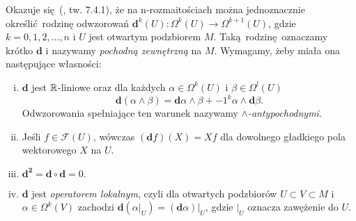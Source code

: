 Okazuje się (\cite{marsden}, tw. 7.4.1), że na n-rozmaitościach można jednoznacznie określić rodzinę odwzorowań \(\mathbf{d}^k(U): \Omega^k(U)\to \Omega^{k+1}(U)\), gdzie \(k=0, 1, 2, \dots, n\) i \(U\) jest otwartym podzbiorem \(M\). Taką rodzinę oznaczamy krótko \(\mathbf{d}\) i nazywamy \emph{pochodną zewnętrzną} na \(M\). Wymagamy, żeby miała ona następujące własności:
\begin{enumerate}[i)]
    \item \(\mathbf{d}\) jest \(\mathbb{R}\)-liniowe oraz dla każdych \(\alpha\in \Omega^k(U)\) i \(\beta\in \Omega^l(U)\)
        \begin{equation*}
                \mathbf{d}(\alpha \wedge \beta) = \mathbf{d}\alpha \wedge \beta + -1^k \alpha \wedge \mathbf{d}\beta.
        \end{equation*}
        Odwzorowania spełniające ten warunek nazywamy \emph{\(\wedge\)-antypochodnymi}.
    \item Jeśli \(f\in\mathcal{F}(U)\), wówczas \((\mathbf{d}f)(X)=Xf\) dla dowolnego gładkiego pola wektorowego \(X\) na \(U\).
    \item \(\mathbf{d^2} = \mathbf{d} \circ \mathbf{d} = 0.\)
    \item \(\mathbf{d}\) jest \emph{operatorem lokalnym}, czyli dla otwartych podzbiorów \(U \subset V \subset M\) i \(\alpha\in\Omega^k(V)\) zachodzi \(\mathbf{d}(\left.\alpha\right|_U)  = \left.(\mathbf{d}\alpha)\right|_U\), gdzie \(|_U\) oznacza zawężenie do \(U\).
\end{enumerate}




